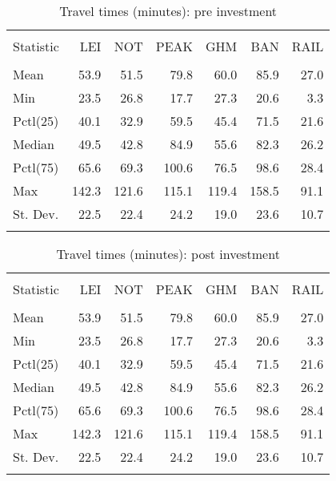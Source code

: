 \documentclass{article}\usepackage[]{graphicx}\usepackage[]{color}
\begin{document}
\begin{table}[!htbp] \centering 
  \caption{Travel times (minutes): pre investment} 
  \label{} 
\small 
\begin{tabular}{@{\extracolsep{2pt}}lD{.}{.}{-1} D{.}{.}{-1} D{.}{.}{-1} D{.}{.}{-1} D{.}{.}{-1} D{.}{.}{-1} } 
\\[-1.8ex]\hline 
\hline \\[-1.8ex] 
Statistic & LEI & NOT & PEAK & GHM & BAN & RAIL \\ 
\hline \\[-1.8ex] 
Mean & 53.9 & 51.5 & 79.8 & 60.0 & 85.9 & 27.0 \\ 
Min & 23.5 & 26.8 & 17.7 & 27.3 & 20.6 & 3.3 \\ 
Pctl(25) & 40.1 & 32.9 & 59.5 & 45.4 & 71.5 & 21.6 \\ 
Median & 49.5 & 42.8 & 84.9 & 55.6 & 82.3 & 26.2 \\ 
Pctl(75) & 65.6 & 69.3 & 100.6 & 76.5 & 98.6 & 28.4 \\ 
Max & 142.3 & 121.6 & 115.1 & 119.4 & 158.5 & 91.1 \\ 
St. Dev. & 22.5 & 22.4 & 24.2 & 19.0 & 23.6 & 10.7 \\ 
\hline \\[-1.8ex] 
\end{tabular} 
\end{table} 

\begin{table}[!htbp] \centering 
  \caption{Travel times (minutes): post investment} 
  \label{} 
\small 
\begin{tabular}{@{\extracolsep{2pt}}lD{.}{.}{-1} D{.}{.}{-1} D{.}{.}{-1} D{.}{.}{-1} D{.}{.}{-1} D{.}{.}{-1} } 
\\[-1.8ex]\hline 
\hline \\[-1.8ex] 
Statistic & LEI & NOT & PEAK & GHM & BAN & RAIL \\ 
\hline \\[-1.8ex] 
Mean & 53.9 & 51.5 & 79.8 & 60.0 & 85.9 & 27.0 \\ 
Min & 23.5 & 26.8 & 17.7 & 27.3 & 20.6 & 3.3 \\ 
Pctl(25) & 40.1 & 32.9 & 59.5 & 45.4 & 71.5 & 21.6 \\ 
Median & 49.5 & 42.8 & 84.9 & 55.6 & 82.3 & 26.2 \\ 
Pctl(75) & 65.6 & 69.3 & 100.6 & 76.5 & 98.6 & 28.4 \\ 
Max & 142.3 & 121.6 & 115.1 & 119.4 & 158.5 & 91.1 \\ 
St. Dev. & 22.5 & 22.4 & 24.2 & 19.0 & 23.6 & 10.7 \\ 
\hline \\[-1.8ex] 
\end{tabular} 
\end{table} 
\end{document}

